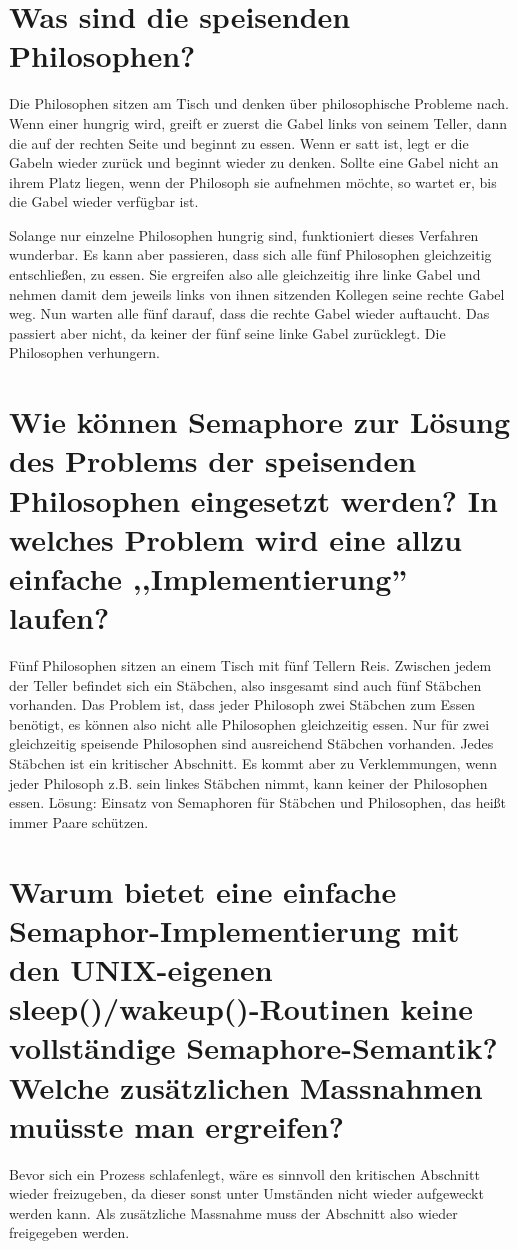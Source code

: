 \documentclass[12pt,a4paper,ngerman]{scrartcl}
\newcommand{\question}[1]{#1}
\newenvironment {answer}
                {}
                {}
\begin{document}
\section{\question{Was sind die speisenden Philosophen?}}
\begin{answer}
Die Philosophen sitzen am Tisch und denken über philosophische Probleme nach. Wenn einer hungrig wird, greift er zuerst die Gabel links von seinem Teller, dann die auf der rechten Seite und beginnt zu essen. Wenn er satt ist, legt er die Gabeln wieder zurück und beginnt wieder zu denken. Sollte eine Gabel nicht an ihrem Platz liegen, wenn der Philosoph sie aufnehmen möchte, so wartet er, bis die Gabel wieder verfügbar ist.

Solange nur einzelne Philosophen hungrig sind, funktioniert dieses Verfahren wunderbar. Es kann aber passieren, dass sich alle fünf Philosophen gleichzeitig entschließen, zu essen. Sie ergreifen also alle gleichzeitig ihre linke Gabel und nehmen damit dem jeweils links von ihnen sitzenden Kollegen seine rechte Gabel weg. Nun warten alle fünf darauf, dass die rechte Gabel wieder auftaucht. Das passiert aber nicht, da keiner der fünf seine linke Gabel zurücklegt. Die Philosophen verhungern.
\end{answer}

\section{\question{Wie können Semaphore zur Lösung des Problems der speisenden Philosophen eingesetzt werden? In welches Problem wird eine allzu einfache ,,Implementierung'' laufen?}}
\begin{answer}
Fünf Philosophen sitzen an einem Tisch mit fünf Tellern Reis. Zwischen jedem der Teller befindet
sich ein Stäbchen, also insgesamt sind auch fünf Stäbchen vorhanden. Das Problem ist, dass jeder
Philosoph zwei Stäbchen zum Essen benötigt, es können also nicht alle Philosophen gleichzeitig
essen. Nur für zwei gleichzeitig speisende Philosophen sind ausreichend Stäbchen vorhanden.
Jedes Stäbchen ist ein kritischer Abschnitt. Es kommt aber zu Verklemmungen, wenn jeder Philosoph
z.B. sein linkes Stäbchen nimmt, kann keiner der Philosophen essen.
Lösung: Einsatz von Semaphoren für Stäbchen und Philosophen, das heißt immer Paare schützen.
\end{answer}

\section{\question{Warum bietet eine einfache Semaphor-Implementierung mit den UNIX-eigenen sleep()/wakeup()-Routinen keine vollständige Semaphore-Semantik? Welche zusätzlichen Massnahmen muüsste man
ergreifen?}}
\begin{answer}
Bevor sich ein Prozess schlafenlegt, wäre es sinnvoll den kritischen Abschnitt wieder freizugeben,
da dieser sonst unter Umständen nicht wieder aufgeweckt werden kann. Als zusätzliche Massnahme
muss der Abschnitt also wieder freigegeben werden.
\end{answer}
\end{document}
